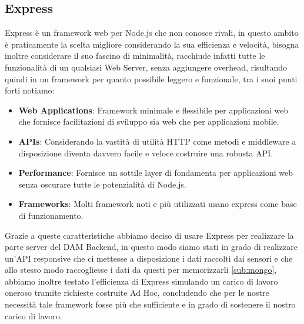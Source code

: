\documentclass{article}
\begin{document}
\subsection{Express}
Express è un framework web per Node.js che non conosce rivali, in questo ambito è praticamente la scelta migliore considerando la sua efficienza e velocità, bisogna inoltre considerare il suo fascino di minimalità, racchiude infatti tutte le funzionalità di un qualsiasi Web Server, senza aggiungere overhead, risultando quindi in un framework per quanto possibile leggero e funzionale, tra i suoi punti forti notiamo:
\begin{itemize}
	\item \textbf{Web Applications}: Framework minimale e flessibile per applicazioni web che fornisce facilitazioni di sviluppo sia web che per applicazioni mobile.
	\item \textbf{APIs}: Considerando la vastità di utilità HTTP come metodi e middleware a disposizione diventa davvero facile e veloce costruire una robusta API.
	\item \textbf{Performance}: Fornisce un sottile layer di fondamenta per applicazioni web senza oscurare tutte le potenzialità di Node.js.
	\item \textbf{Frameworks}: Molti framework noti e più utilizzati usano express come base di funzionamento.
\end{itemize}
Grazie a queste caratteristiche abbiamo deciso di usare Express per realizzare la parte server del DAM Backend, in questo modo siamo stati in grado di realizzare un'API responsive che ci mettesse a disposizione i dati raccolti dai sensori e che allo stesso modo raccogliesse i dati da questi per memorizzarli \ref{sub:mongo}, abbiamo inoltre testato l'efficienza di Express simulando un carico di lavoro oneroso tramite richieste costruite Ad Hoc, concludendo che per le nostre necessità tale framework fosse più che sufficiente e in grado di sostenere il nostro carico di lavoro.
\end{document}
